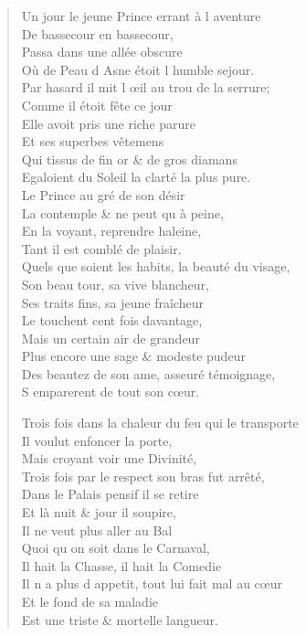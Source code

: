 \begin{verse}
Un jour le jeune Prince errant à l\textquotesingle{} aventure \\
\vin De bassecour en bassecour, \\
\vin Passa dans une allée obscure \\
\vin Où de Peau d\textquotesingle{} Asne étoit l\textquotesingle{} humble sejour. \\
Par hasard il mit l\textquotesingle{} œil au trou de la serrure; \\
\vin Comme il étoit fête ce jour \\
\vin Elle avoit pris une riche parure \\
\vin Et ses superbes vêtemens \\
Qui tissus de fin or \& de gros diamans \\
Egaloient du Soleil la clarté la plus pure. \\
\vin Le Prince au gré de son désir \\
\vin La contemple \& ne peut qu\textquotesingle{} à peine, \\
\vin En la voyant, reprendre haleine, \\
\vin Tant il est comblé de plaisir. \\
Quels que soient les habits, la beauté du visage, \\
\vin Son beau tour, sa vive blancheur, \\
\vin Ses traits fins, sa jeune fraîcheur \\
\vin Le touchent cent fois davantage, \\
\vin Mais un certain air de grandeur \\
Plus encore une sage \& modeste pudeur \\
Des beautez de son ame, asseuré témoignage, \\
\vin S\textquotesingle{} emparerent de tout son cœur.

Trois fois dans la chaleur du feu qui le transporte \\
\vin Il voulut enfoncer la porte, \\
\vin Mais croyant voir une Divinité, \\
Trois fois par le respect son bras fut arrêté, \\
Dans le Palais pensif il se retire \\
\vin Et là nuit \& jour il soupire, \\
\vin Il ne veut plus aller au Bal \\
\vin Quoi qu\textquotesingle{} on soit dans le Carnaval, \\
\vin Il hait la Chasse, il hait la Comedie \\
Il n\textquotesingle{} a plus d\textquotesingle{} appetit, tout lui fait mal au cœur \\
\vin Et le fond de sa maladie \\
\vin Est une triste \& mortelle langueur.


\end{verse}
